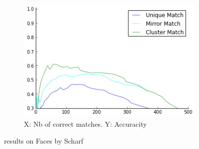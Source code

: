 \documentclass{article}
\begin{document}
\begin{figure}
{\begin{subfigure}[t]{0.35\textwidth}
			\label{fig:faces2}
		\end{subfigure}%
		~ %
		\begin{subfigure}[t]{0.35\textwidth}
			\centering
			\includegraphics[width=\textwidth]{images/result_scharf}
			\caption{X: Nb of correct matches. Y: Accuracity}
			\label{fig:result_faces}
		\end{subfigure}%
	}%
	\label{fig:faces}
	\caption{results on Faces by Scharf}
\end{figure}
\end{document}
